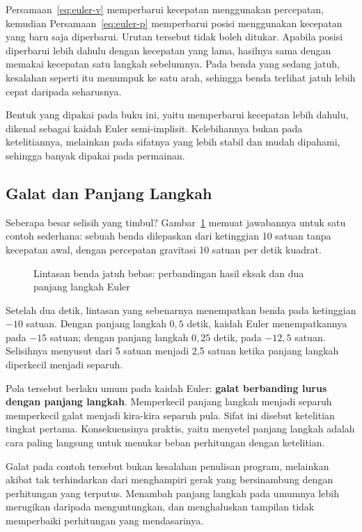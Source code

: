 Persamaan~\eqref{eq:euler-v} memperbarui kecepatan menggunakan percepatan,
kemudian Persamaan~\eqref{eq:euler-p} memperbarui posisi menggunakan kecepatan
yang baru saja diperbarui. Urutan tersebut tidak boleh ditukar. Apabila posisi
diperbarui lebih dahulu dengan kecepatan yang lama, hasilnya sama dengan
memakai kecepatan satu langkah sebelumnya. Pada benda yang sedang jatuh,
kesalahan seperti itu menumpuk ke satu arah, sehingga benda terlihat jatuh
lebih cepat daripada seharusnya.

Bentuk yang dipakai pada buku ini, yaitu memperbarui kecepatan lebih dahulu,
dikenal sebagai kaidah Euler semi-implisit. Kelebihannya bukan pada
ketelitiannya, melainkan pada sifatnya yang lebih stabil dan mudah dipahami,
sehingga banyak dipakai pada permainan.

\subsection{Galat dan Panjang Langkah}

Seberapa besar selisih yang timbul? Gambar~\ref{fig:integrasi-euler} memuat
jawabannya untuk satu contoh sederhana: sebuah benda dilepaskan dari
ketinggian 10 satuan tanpa kecepatan awal, dengan percepatan gravitasi 10
satuan per detik kuadrat.

\begin{figure}[htbp]
\centering

\caption{Lintasan benda jatuh bebas: perbandingan hasil eksak dan dua panjang langkah Euler}
\label{fig:integrasi-euler}
\end{figure}

Setelah dua detik, lintasan yang sebenarnya menempatkan benda pada ketinggian
$-10$ satuan. Dengan panjang langkah $0{,}5$ detik, kaidah Euler menempatkannya
pada $-15$ satuan; dengan panjang langkah $0{,}25$ detik, pada $-12{,}5$
satuan. Selisihnya menyusut dari 5 satuan menjadi 2,5 satuan ketika panjang
langkah diperkecil menjadi separuh.

Pola tersebut berlaku umum pada kaidah Euler: \textbf{galat berbanding lurus
dengan panjang langkah}. Memperkecil panjang langkah menjadi separuh
memperkecil galat menjadi kira-kira separuh pula. Sifat ini disebut ketelitian
tingkat pertama. Konsekuensinya praktis, yaitu menyetel panjang langkah adalah
cara paling langsung untuk menukar beban perhitungan dengan ketelitian.

\begin{catatabox}
Galat pada contoh tersebut bukan kesalahan penulisan
program, melainkan akibat tak terhindarkan dari menghampiri gerak yang
bersinambung dengan perhitungan yang terputus. Menambah panjang langkah pada
umumnya lebih merugikan daripada menguntungkan, dan menghaluskan tampilan
tidak memperbaiki perhitungan yang mendasarinya.
\end{catatabox}

